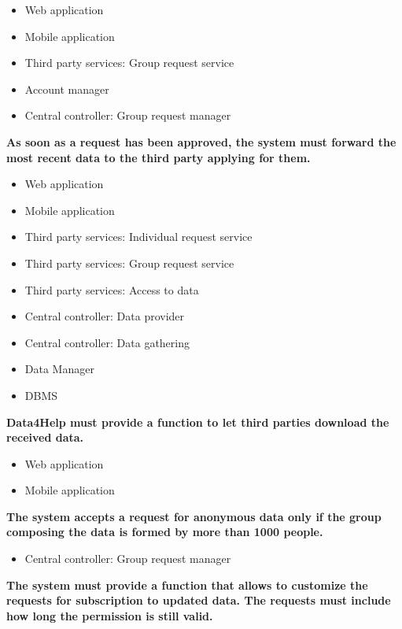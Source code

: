 \begin{enumerate} [label={\bf[R\arabic*]}]
        \begin{itemize}
            \item Web application
            \item Mobile application
            \item Third party services: Group request service
            \item Account manager
            \item Central controller: Group request manager
        \end{itemize}
    \item \textbf{As soon as a request has been approved, the system must forward the most recent data to the third party applying for them.}
        \begin{itemize}
            \item Web application
            \item Mobile application
            \item Third party services: Individual request service
            \item Third party services: Group request service
            \item Third party services: Access to data
            \item Central controller: Data provider
            \item Central controller: Data gathering
            \item Data Manager
            \item DBMS
        \end{itemize}
    \item \textbf{Data4Help must provide a function to let third parties download the received data.}
        \begin{itemize}
            \item Web application
            \item Mobile application
        \end{itemize}
    \item \textbf{The system accepts a request for anonymous data only if the group composing the data is formed by more than 1000 people.}
        \begin{itemize}
            \item Central controller: Group request manager
        \end{itemize}
    \item \textbf{The system must provide a function that allows to customize the requests for subscription to updated data. The requests must include how long the permission is still valid.}

\end{enumerate}
